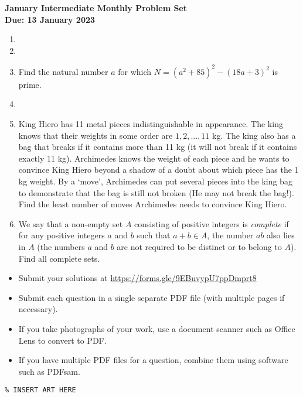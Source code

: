 \documentclass{article}
\begin{document}
\thispagestyle{empty}

\begin{center}
  \textbf{\Large January Intermediate Monthly Problem Set}
  \\ \vspace{1em}
  \textbf{\large Due: 13 January 2023}
\end{center}

\bigskip \bigskip

\begin{enumerate}[itemsep=\fill]

\item %
 
\item %


\item %
Find the natural number $a$ for which $N = (a^{2} + 85)^{2} - (18a+3)^{2}$ is prime.


\item %


\item %
King Hiero has 11 metal pieces indistinguishable in appearance. The king knows that their weights in some order are $1,2,...,11$ kg. The king also has a bag that breaks if it contains more than 11 kg (it will not break if it contains exactly 11 kg). Archimedes knows the weight of each piece and he wants to convince King Hiero beyond a shadow of a doubt about which piece has the 1 kg weight. By a `move', Archimedes can put several pieces into the king bag to demonstrate that the bag is still not broken (He may not break the bag!). Find the least number of moves Archimedes needs to convince King Hiero.


\item %
We say that a non-empty set $A$ consisting of positive integers is \textit{complete} if for any positive integers $a$ and $b$ such that $a+b\in A$, the number $ab$ also lies in $A$ (the numbers $a$ and $b$ are not required to be distinct or to belong to $A$). Find all complete sets.

\end{enumerate}


\vfill
\small
\begin{itemize}
	\item Submit your solutions at \href{https://forms.gle/9EBuvypU7ppDmprt8}{https://forms.gle/9EBuvypU7ppDmprt8}
	\item Submit each question in a single separate PDF file (with multiple pages if necessary).
	\item If you take photographs of your work, use a document scanner such as Office Lens to convert to PDF.
	\item If you have multiple PDF files for a question, combine them using software such as PDFsam.
\end{itemize}

\vfill
\centering
\small
\begin{BVerbatim}
\end{BVerbatim}
\end{document}
